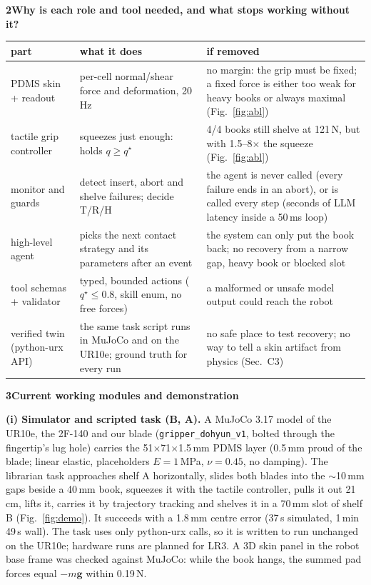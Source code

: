 \documentclass[10pt]{article}
\newcommand{\code}[1]{\texttt{\small #1}}
\newcommand{\tplq}[2]{\par\vspace{3pt}\noindent\colorbox{tplrow}{\parbox{\dimexpr\linewidth-2\fboxsep}{%
  {\color{tplorange}\bfseries #1}\hspace{0.45em}\textbf{#2}}}\par\vspace{1pt}}
\begin{document}
\begin{minipage}{\linewidth}
\tplq{2}{Why is each role and tool needed, and what stops working without it?}
{\footnotesize\setlength{\tabcolsep}{4pt}
\begin{tabularx}{\linewidth}{@{}L{3.1cm}L{5.5cm}X@{}}\toprule
part & what it does & if removed\\\midrule
PDMS skin + readout & per-cell normal/shear force and deformation, 20\,Hz & no margin: the grip must be fixed; a fixed force is either too weak for heavy books or always maximal (Fig.~\ref{fig:abl})\\
tactile grip controller & squeezes just enough: holds $q\ge q^\star$ & 4/4 books still shelve at 121\,N, but with 1.5--8$\times$ the squeeze (Fig.~\ref{fig:abl})\\
monitor and guards & detect insert, abort and shelve failures; decide T/R/H & the agent is never called (every failure ends in an abort), or is called every step (seconds of LLM latency inside a 50\,ms loop)\\
high-level agent & picks the next contact strategy and its parameters after an event & the system can only put the book back; no recovery from a narrow gap, heavy book or blocked slot\\
tool schemas + validator & typed, bounded actions ($q^\star\le0.8$, skill enum, no free forces) & a malformed or unsafe model output could reach the robot\\
verified twin (python-urx API) & the same task script runs in MuJoCo and on the UR10e; ground truth for every run & no safe place to test recovery; no way to tell a skin artifact from physics (Sec.~C3)\\\bottomrule
\end{tabularx}}
\end{minipage}

\tplq{3}{Current working modules and demonstration}
\textbf{(i) Simulator and scripted task (B, A).} A MuJoCo 3.17 model of the UR10e, the 2F-140 and our blade
(\code{gripper\_dohyun\_v1}, bolted through the fingertip's lug hole) carries the 51$\times$71$\times$1.5\,mm PDMS
layer (0.5\,mm proud of the blade; linear elastic, placeholders $E=1$\,MPa, $\nu=0.45$, no damping). The librarian task
approaches shelf A horizontally, slides both blades into the $\sim$10\,mm gaps beside a 40\,mm book, squeezes it with
the tactile controller, pulls it out 21\,cm, lifts it, carries it by trajectory tracking and shelves it in a 70\,mm
slot of shelf B (Fig.~\ref{fig:demo}). It succeeds with a 1.8\,mm centre error (37\,s simulated, 1\,min 49\,s wall).
The task uses only python-urx calls, so it is written to run unchanged on the UR10e; hardware runs are planned for
LR3. A 3D skin panel in the robot base frame was checked against MuJoCo: while the book hangs, the summed pad forces
equal $-m\mathbf g$ within 0.19\,N.
\end{document}
